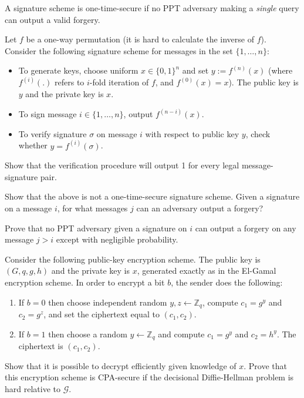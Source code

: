 \documentclass[a4paper,10pt,landscape,twocolumn]{scrartcl}
\begin{document}
\begin{exercise}
A signature scheme is one-time-secure if no PPT adversary making a \emph{single} query can output a valid forgery.

Let $f$ be a one-way permutation (it is hard to calculate the inverse of $f$). Consider the following signature
scheme for messages in the set $\{1,\dots , n\}$:
\begin{itemize}
\item To generate keys, choose uniform $x \in \{0, 1\}^n$ and set $y := f^{(n)} (x)$
(where $f^{(i)}(.)$ refers to $i$-fold iteration of $f$, and $f^{(0)} (x) = x$). The
public key is $y$ and the private key is $x$.
\item To sign message $i \in \{1,\dots , n\}$, output $f^{(n-i)} (x)$.
\item To verify signature $\sigma$ on message $i$ with respect to public key $y$,
check whether $y = f^{(i)} (\sigma)$.
\end{itemize}

\begin{subex}
Show that the verification procedure will output 1 for every legal message-signature pair.
\end{subex}
\begin{subex}
Show that the above is not a one-time-secure signature scheme.
Given a signature on a message $i$, for what messages $j$ can an
adversary output a forgery?
\end{subex}
\begin{subex}
Prove that no PPT adversary given a signature on $i$ can output a
forgery on any message $j > i$ except with negligible probability.
\end{subex}
\end{exercise}

\begin{exercise}
	Consider the following public-key encryption scheme. The public key is $(G,q,g,h)$ and the private key is $x$, generated exactly as in the El-Gamal encryption scheme. In order to encrypt a bit $b$, the sender does the following:
	\begin{enumerate}
		\item If $b=0$ then choose independent random $y,z \leftarrow \mathbb{Z}_q$, compute $c_1 = g^y$ and $c_2 = g^z$, and set the ciphertext equal to $(c_1, c_2)$.
		\item If $b = 1$ then choose a random $y\leftarrow \mathbb{Z}_q$ and compute $c_1 =g^y$ and $c_2 = h^y$. The ciphertext is $(c_1, c_2)$.
	\end{enumerate}
	Show that it is possible to decrypt efficiently given knowledge of $x$. Prove that this encryption scheme is CPA-secure if the decisional Diffie-Hellman problem is hard relative to $\mathcal{G}$.
\end{exercise}
\end{document}
